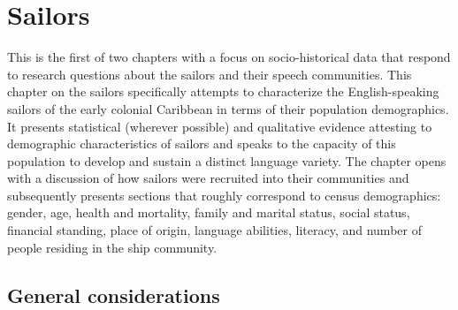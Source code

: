 \chapter{ \textbf{Sailors} }

This is the first of two chapters with a focus on socio-historical data that respond to research questions about the sailors and their speech communities. This chapter on the sailors specifically attempts to characterize the English-speaking sailors of the early colonial Caribbean in terms of their population demographics. It presents statistical (wherever possible) and qualitative evidence attesting to demographic characteristics of sailors and speaks to the capacity of this population to develop and sustain a distinct language variety. The chapter opens with a discussion of how sailors were recruited into their communities and subsequently presents sections that roughly correspond to census demographics: gender, age, health and mortality, family and marital status, social status, financial standing, place of origin, language abilities, literacy, and number of people residing in the ship community. 

\section{\textbf{General} \textbf{considerations}}%

